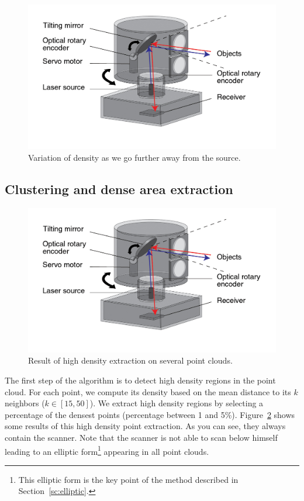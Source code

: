 \begin{figure}
  \centering
  \includegraphics[scale=1]{img/lidar.jpg}
  \caption{Variation of density as we go further away from the source.}
  \label{fig:density}
\end{figure}


\subsection{Clustering and dense area extraction}
\label{subsc:highdens}
\begin{figure}
  \centering
  \includegraphics[scale=1]{img/lidar.jpg}
  \caption{Result of high density extraction on several point clouds.}
  \label{fig:highdens}
\end{figure}

The first step of the algorithm is to detect high density regions in the point cloud. For each point, we compute its density based on the mean distance to its $k$ neighbors ($k \in [15,50]$). We extract high density regions by selecting a percentage of the densest points (percentage between 1 and 5\%). Figure~\ref{fig:highdens} shows some results of this high density point extraction. As you can see, they always contain the scanner. Note that the scanner is not able to scan below himself leading to an elliptic form\footnote{This elliptic form is the key point of the method described in Section~\ref{sc:elliptic}.} appearing in all point clouds.

